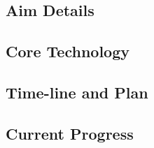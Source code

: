 \subsection{Aim Details}


\subsection{Core Technology}


\subsection{Time-line and Plan}



\subsection{Current Progress}




